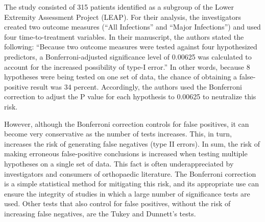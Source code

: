 The study consisted of 315 patients identified as a subgroup of the Lower Extremity Assessment Project (LEAP). For their analysis, the investigators created two outcome measures (“All Infections” and “Major Infections”) and used four time-to-treatment variables. In their manuscript, the authors stated the following: “Because two outcome measures were tested against four hypothesized predictors, a Bonferroni-adjusted significance level of 0.00625 was calculated to account for the increased possibility of type-I error.” In other words, because 8 hypotheses were being tested on one set of data, the chance of obtaining a false-positive result was 34 percent. Accordingly, the authors used the Bonferroni correction to adjust the P value for each hypothesis to 0.00625 to neutralize this risk.

However, although the Bonferroni correction controls for false positives, it can become very conservative as the number of tests increases. This, in turn, increases the risk of generating false negatives (type II errors).
In sum, the risk of making erroneous false-positive conclusions is increased when testing multiple hypotheses on a single set of data. This fact is often underappreciated by investigators and consumers of orthopaedic literature. The Bonferroni correction is a simple statistical method for mitigating this risk, and its appropriate use can ensure the integrity of studies in which a large number of significance tests are used. Other tests that also control for false positives, without the risk of increasing false negatives, are the Tukey and Dunnett’s tests.
